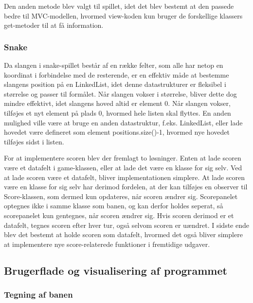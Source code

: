 \documentclass{report}
\begin{document}
Den anden metode blev valgt til spillet, idet det blev bestemt at den passede bedre til MVC-modellen, hvormed view-koden kun bruger de forskellige klassers get-metoder til at få information. %

\subsubsection{Snake}
Da slangen i snake-spillet består af en række felter, som alle har netop en koordinat i forbindelse med de resterende, er en effektiv måde at bestemme slangens position på en LinkedList, idet denne datastrukturer er fleksibel i størrelse og passer til formålet. Når slangen vokser i størrelse, bliver dette dog mindre effektivt, idet slangens hoved altid er element 0. Når slangen vokser, tilføjes et nyt element på plads 0, hvormed hele listen skal flyttes. En anden mulighed ville være at bruge en anden datastruktur, f.eks. LinkedList, eller lade hovedet være defineret som element positions.size()-1, hvormed nye hovedet tilføjes sidst i listen.

For at implementere scoren blev der fremlagt to løsninger. Enten at lade scoren være et datafelt i game-klassen, eller at lade det være en klasse for sig selv. Ved at lade scoren være et datafelt, bliver implementationen simplere. At lade scoren være en klasse for sig selv har derimod fordelen, at der kan 
tilføjes en observer til Score-klassen, som dermed kun opdateres, når scoren ændrer sig. Scorepanelet optegnes ikke i samme klasse som banen, og kan derfor holdes seperat, så scorepanelet kun gentegnes, når scoren ændrer sig. Hvis scoren derimod er et datafelt, tegnes scoren efter hver tur, også selvom scoren er uændret. I sidste ende blev det bestemt at holde scoren som datafelt, hvormed det også bliver simplere at implementere nye score-relaterede funktioner i fremtidige udgaver.

\subsection{Brugerflade og visualisering af programmet}
\subsubsection{Tegning af banen}
\end{document}
